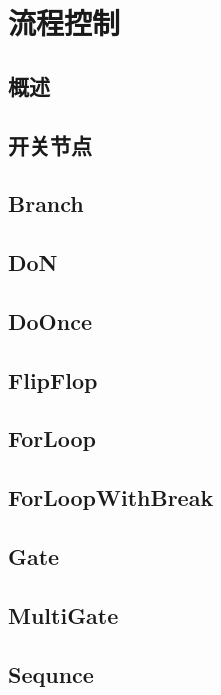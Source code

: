 \documentclass[UTF8,a4paper,12pt]{ctexbook}
\begin{document}
	\section{流程控制}
		\subsection{概述}
		
		\subsection{开关节点}
		
		\subsection{Branch}
		
		\subsection{DoN}
		
		\subsection{DoOnce}
		
		\subsection{FlipFlop}
		
		\subsection{ForLoop}
		
		\subsection{ForLoopWithBreak}
		
		\subsection{Gate}
		
		\subsection{MultiGate}

		\subsection{Sequnce}
		
\end{document}
